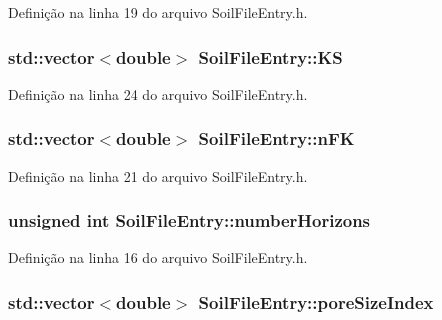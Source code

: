 Definição na linha 19 do arquivo Soil\+File\+Entry.\+h.

\subsubsection[{KS}]{\setlength{\rightskip}{0pt plus 5cm}std\+::vector$<$double$>$ Soil\+File\+Entry\+::\+KS\hspace{0.3cm}{\ttfamily [protected]}}\label{class_soil_file_entry_aa2ba04b0fa02d7570d87651e539161c6}


Definição na linha 24 do arquivo Soil\+File\+Entry.\+h.

\subsubsection[{n\+FK}]{\setlength{\rightskip}{0pt plus 5cm}std\+::vector$<$double$>$ Soil\+File\+Entry\+::n\+FK\hspace{0.3cm}{\ttfamily [protected]}}\label{class_soil_file_entry_a8a0a659515d4347e329a6f6b802d1848}


Definição na linha 21 do arquivo Soil\+File\+Entry.\+h.

\subsubsection[{number\+Horizons}]{\setlength{\rightskip}{0pt plus 5cm}unsigned int Soil\+File\+Entry\+::number\+Horizons\hspace{0.3cm}{\ttfamily [protected]}}\label{class_soil_file_entry_a6d0e77eb1c29ed7665c704b9257c23b8}


Definição na linha 16 do arquivo Soil\+File\+Entry.\+h.

\subsubsection[{pore\+Size\+Index}]{\setlength{\rightskip}{0pt plus 5cm}std\+::vector$<$double$>$ Soil\+File\+Entry\+::pore\+Size\+Index\hspace{0.3cm}{\ttfamily [protected]}}\label{class_soil_file_entry_a1a0fe6828522dfa9c02f8ae0cb6e3862}


